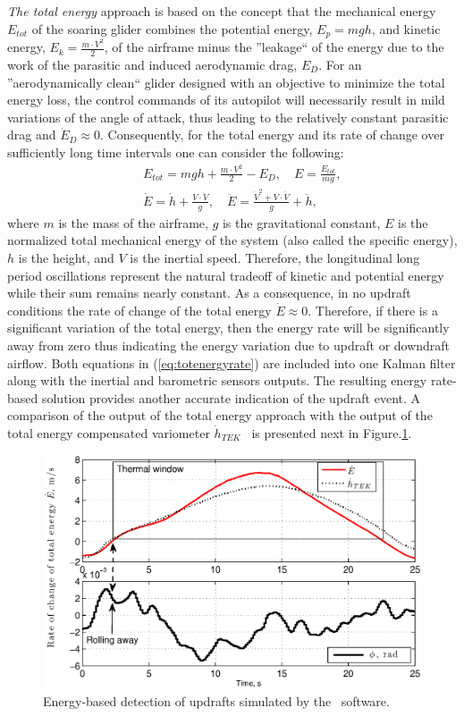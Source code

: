 \documentclass[letterpaper, 10 pt, conference]{ieeeconf}  %
\begin{document}
\emph{The total energy} approach is based on the concept that the mechanical energy $E_{tot}$ of
the soaring glider combines the potential energy, $E_p=mgh$, and kinetic energy, $E_k=\frac{m\cdot V^2}{2}$, of the airframe minus the ''leakage`` of the energy due to the work of the parasitic and induced aerodynamic drag, $E_{D}$. For an ''aerodynamically clean`` glider designed with an objective to
minimize the total energy loss, the control commands of its autopilot will necessarily result in mild variations of the angle of attack, thus leading to the relatively constant parasitic drag and $\dot{E}_{D}\approx0$. Consequently, for the total energy and its rate of change over sufficiently
long time intervals one can consider the following:
\begin{eqnarray}
    && E_{tot}=mgh+\frac{m\cdot V^2}{2}-E_{D}, \quad E=\frac{E_{tot}}{mg}, \nonumber \\
    && \dot{E}=\dot{h}+\frac{V \cdot \dot{V}}{g}, \quad \ddot{E}=\frac{\dot{V}^2 + V \cdot
    \ddot{V}}{g} + \ddot{h},
    \label{eq:totenergyrate}
\end{eqnarray}
where $m$ is the mass of the airframe, $g$ is the gravitational constant, $E$ is the normalized total mechanical energy of the system (also called the specific energy), $h$ is the height, and $V$ is the inertial speed. Therefore, the longitudinal long period oscillations represent the natural tradeoff of kinetic and potential energy while their sum remains nearly constant. As a consequence, in no updraft conditions the rate of change of the total energy $\dot{E}\approx 0$. Therefore, if there is a significant variation of the total energy, then the energy rate will be significantly away from zero thus indicating the energy variation due to updraft or downdraft airflow. Both equations in (\ref{eq:totenergyrate}) are included into one Kalman filter along with the inertial and barometric sensors outputs. The resulting energy rate-based solution provides another accurate indication of the updraft event. A comparison of the output of the total energy approach with the output of the total energy compensated variometer $\dot{h}_{TEK}$~\cite{PitLab:2013:Online} is presented next in Figure.\ref{fig:ThermalDetection}.
\begin{figure}[thpb]
  \centering
  \includegraphics[scale=0.44]{Figures/TEK_Bank.eps}
  \caption{Energy-based detection of updrafts simulated by the~\cite{Condor:2013:Online} software.}
  \label{fig:ThermalDetection}
\end{figure}
\end{document}
